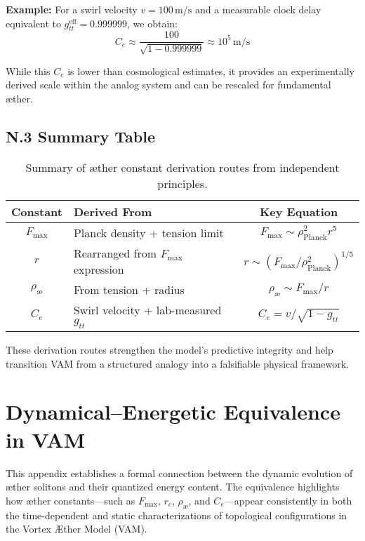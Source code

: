 \textbf{Example:} For a swirl velocity $v = 100 \, \text{m/s}$ and a measurable clock delay equivalent to $g_{tt}^{\text{eff}} = 0.999999$, we obtain:
\begin{equation}
    C_e \approx \frac{100}{\sqrt{1 - 0.999999}} \approx 10^5 \, \text{m/s}
\end{equation}

While this $C_e$ is lower than cosmological estimates, it provides an experimentally derived scale within the analog system and can be rescaled for fundamental æther.

\subsection*{N.3 Summary Table}

\begin{table}[H]
\centering
\renewcommand{\arraystretch}{1.2}
\begin{tabular}{|c|l|c|}
\hline
\textbf{Constant} & \textbf{Derived From} & \textbf{Key Equation} \\
\hline
$F_{\max}$ & Planck density + tension limit & $F_{\max} \sim \rho_{\text{Planck}}^2 r^5$ \\
$r$ & Rearranged from $F_{\max}$ expression & $r \sim \left(F_{\max} / \rho_{\text{Planck}}^2\right)^{1/5}$ \\
$\rho_{\text{æ}}$ & From tension + radius & $\rho_{\text{æ}} \sim F_{\max} / r$ \\
$C_e$ & Swirl velocity + lab-measured $g_{tt}$ & $C_e = v / \sqrt{1 - g_{tt}}$ \\
\hline
\end{tabular}
\caption{Summary of æther constant derivation routes from independent principles.}
\end{table}

\vspace{1em}

These derivation routes strengthen the model’s predictive integrity and help transition VAM from a structured analogy into a falsifiable physical framework.


\section{Dynamical–Energetic Equivalence in VAM}

This appendix establishes a formal connection between the dynamic evolution of æther solitons and their quantized energy content. The equivalence highlights how æther constants—such as $F_{\max}$, $r_c$, $\rho_{\text{æ}}$, and $C_e$—appear consistently in both the time-dependent and static characterizations of topological configurations in the Vortex Æther Model (VAM).


